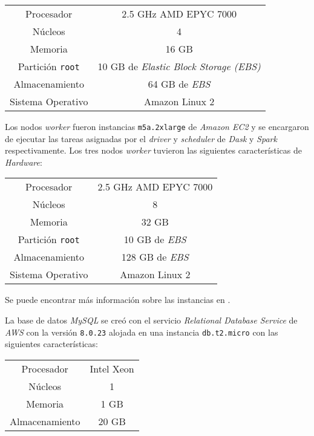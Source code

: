 \begin{center}
\begin{tabular}{|c|c|}
 \hline
  Procesador & 2.5 GHz AMD EPYC 7000 \\ 
  Núcleos & 4 \\
  Memoria & 16 GB \\ 
  Partición \texttt{root} & 10 GB de \textit{Elastic Block Storage (EBS)}  \\
  Almacenamiento & 64 GB de \textit{EBS}  \\ 
  Sistema Operativo & Amazon Linux 2 \\
  \hline
\end{tabular}
\end{center}

Los nodos \textit{worker} fueron instancias \texttt{m5a.2xlarge} de \textit{Amazon EC2} y se encargaron de ejecutar las tareas asignadas por el \textit{driver} y \textit{scheduler} de \textit{Dask} y \textit{Spark} respectivamente. Los tres nodos \textit{worker} tuvieron las siguientes características de \textit{Hardware}:

\begin{center}
\begin{tabular}{|c|c|}
 \hline
  Procesador & 2.5 GHz AMD EPYC 7000 \\ 
  Núcleos & 8 \\
  Memoria & 32 GB \\ 
  Partición \texttt{root} & 10 GB de \textit{EBS}  \\
  Almacenamiento & 128 GB de \textit{EBS}  \\ 
  Sistema Operativo & Amazon Linux 2 \\
  \hline
\end{tabular}
\end{center}

Se puede encontrar más información sobre las instancias en \cite{ec2-instances}.

La base de datos \textit{MySQL} se creó con el servicio \textit{Relational Database Service} de \textit{AWS} con la versión \texttt{8.0.23} alojada en una instancia \texttt{db.t2.micro} con las siguientes características:

\begin{center}
\begin{tabular}{|c|c|}
 \hline
  Procesador & Intel Xeon \\ 
  Núcleos & 1 \\
  Memoria & 1 GB \\
  Almacenamiento & 20 GB  \\ 
  \hline
\end{tabular}
\end{center}

